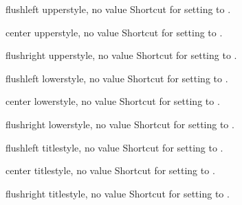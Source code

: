 \begin{docTcbKey}[][doc updated=2015-05-07]{flushleft upper}{}{style, no value}
  Shortcut for setting  to .
\end{docTcbKey}

\begin{docTcbKey}[][doc updated=2015-05-07]{center upper}{}{style, no value}
  Shortcut for setting  to .
\end{docTcbKey}

\begin{docTcbKey}[][doc updated=2015-05-07]{flushright upper}{}{style, no value}
  Shortcut for setting  to .
\end{docTcbKey}

\begin{docTcbKey}[][doc updated=2015-05-07]{flushleft lower}{}{style, no value}
  Shortcut for setting  to .
\end{docTcbKey}

\begin{docTcbKey}[][doc updated=2015-05-07]{center lower}{}{style, no value}
  Shortcut for setting  to .
\end{docTcbKey}

\begin{docTcbKey}[][doc updated=2015-05-07]{flushright lower}{}{style, no value}
  Shortcut for setting  to .
\end{docTcbKey}

\clearpage

\begin{docTcbKey}[][doc updated=2015-05-07]{flushleft title}{}{style, no value}
  Shortcut for setting  to .
\end{docTcbKey}

\begin{docTcbKey}[][doc updated=2015-05-07]{center title}{}{style, no value}
  Shortcut for setting  to .
\end{docTcbKey}

\begin{docTcbKey}[][doc updated=2015-05-07]{flushright title}{}{style, no value}
  Shortcut for setting  to .
\end{docTcbKey}


